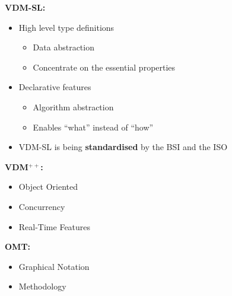 \documentclass[dvips]{slides}
\newcommand{\vpp}{VDM$^{++}$}
\begin{document}
\begin{slide}{}

{\bf VDM-SL:}
\small
\begin{itemize}
\item High level type definitions
  \begin{itemize}
  \item Data abstraction
  \item Concentrate on the essential properties
  \end{itemize}
\item Declarative features
  \begin{itemize}
  \item Algorithm abstraction
  \item Enables ``what'' instead of ``how''
  \end{itemize}
\item VDM-SL is being {\bf standardised} by the BSI and the ISO
\end{itemize}

{\bf \vpp{}:}
\small
\begin{itemize}
\item Object Oriented
\item Concurrency
\item Real-Time Features
\end{itemize}

{\bf OMT:}
\small
\begin{itemize}
\item Graphical Notation
\item Methodology
\end{itemize}
\end{slide}



\begin{slide}{}

\vspace{1cm}
\begin{center}
\end{center}
\end{slide}
\end{document}
